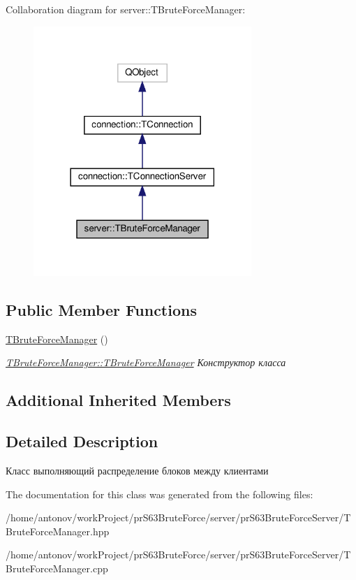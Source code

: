 Collaboration diagram for server\+:\+:T\+Brute\+Force\+Manager\+:\nopagebreak
\begin{figure}[H]
\begin{center}
\leavevmode
\includegraphics[width=234pt]{classserver_1_1_t_brute_force_manager__coll__graph}
\end{center}
\end{figure}
\subsection*{Public Member Functions}
\begin{DoxyCompactItemize}
\item 
\mbox{\label{classserver_1_1_t_brute_force_manager_ac7c9f1590534d38fe05c422e7fada979}} 
\hyperlink{classserver_1_1_t_brute_force_manager_ac7c9f1590534d38fe05c422e7fada979}{T\+Brute\+Force\+Manager} ()
\begin{DoxyCompactList}\small\item\em \hyperlink{classserver_1_1_t_brute_force_manager_ac7c9f1590534d38fe05c422e7fada979}{T\+Brute\+Force\+Manager\+::\+T\+Brute\+Force\+Manager} Конструктор класса \end{DoxyCompactList}\end{DoxyCompactItemize}
\subsection*{Additional Inherited Members}


\subsection{Detailed Description}
Класс выполняющий распределение блоков между клиентами 

The documentation for this class was generated from the following files\+:\begin{DoxyCompactItemize}
\item 
/home/antonov/work\+Project/pr\+S63\+Brute\+Force/server/pr\+S63\+Brute\+Force\+Server/T\+Brute\+Force\+Manager.\+hpp\item 
/home/antonov/work\+Project/pr\+S63\+Brute\+Force/server/pr\+S63\+Brute\+Force\+Server/T\+Brute\+Force\+Manager.\+cpp\end{DoxyCompactItemize}
